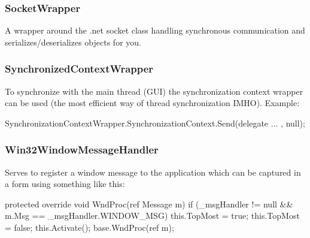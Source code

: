 \subsubsection{SocketWrapper}
A wrapper around the .net socket class handling synchronous communication and serializes/deserializes objects for you.

\subsubsection{SynchronizedContextWrapper}
To synchronize with the main thread (GUI) the synchronization context wrapper can be used (the most efficient way of thread synchronization IMHO). 
Example:
\begin{codelisting}
SynchronizationContextWrapper.SynchronizationContext.Send(delegate
{ ... }, null);
\end{codelisting}

\subsubsection{Win32WindowMessageHandler}
Serves to register a window message to the application which can be captured in a form using something like this:
\begin{codelisting}
protected override void WndProc(ref Message m)
{
	if (_msgHandler != null && m.Msg == _msgHandler.WINDOW_MSG)
	{
        this.TopMost = true;
        this.TopMost = false;
        this.Activate();
	}
	base.WndProc(ref m);
}
\end{codelisting}